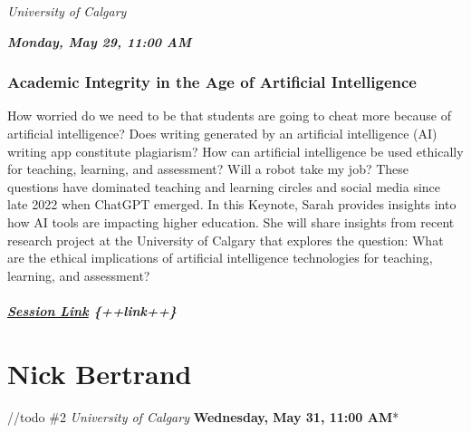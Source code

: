 \documentclass[
]{book}
\begin{document}
\emph{University of Calgary}

\textbf{\emph{Monday, May 29, 11:00 AM}}

\begin{keynote}
\hypertarget{academic-integrity-in-the-age-of-artificial-intelligence}{%
\subsubsection*{Academic Integrity in the Age of Artificial
Intelligence}\label{academic-integrity-in-the-age-of-artificial-intelligence}}

How worried do we need to be that students are going to cheat more
because of artificial intelligence? Does writing generated by an
artificial intelligence (AI) writing app constitute plagiarism? How can
artificial intelligence be used ethically for teaching, learning, and
assessment? Will a robot take my job? These questions have dominated
teaching and learning circles and social media since late 2022 when
ChatGPT emerged. In this Keynote, Sarah provides insights into how AI
tools are impacting higher education. She will share insights from
recent research project at the University of Calgary that explores the
question: What are the ethical implications of artificial intelligence
technologies for teaching, learning, and assessment?

\hypertarget{session-link-link}{%
\subparagraph{\texorpdfstring{\href{}{Session Link}
\{++link++\}}{Session Link \{++link++\}}}\label{session-link-link}}
\end{keynote}

\hypertarget{nick-bertrand}{%
\section*{Nick Bertrand}\label{nick-bertrand}}

//todo \#2
\emph{University of Calgary
}\textbf{Wednesday, May 31, 11:00 AM}*
\end{document}
